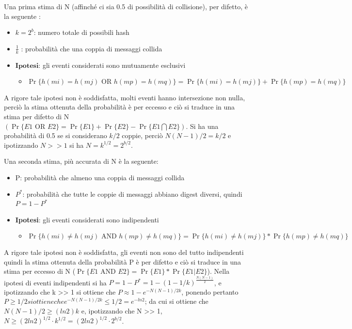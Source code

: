 Una prima stima di N (affinché ci sia 0.5 di possibilità di collisione), per difetto, è la seguente :
\begin{itemize}
\item $k = 2^{b}$: numero totale di possibili hash
\item $\frac{1}{k}$ : probabilità che una coppia di messaggi collida
\item $\textbf{Ipotesi}$: gli eventi considerati sono mutuamente esclusivi 
	\begin{itemize}
		\item $\Pr\{h(mi) = h(mj) \mbox{ OR } h(mp) = h(mq)\} = \Pr\{h(mi) = h(mj)\} + \Pr\{ h(mp) = h(mq)\}$
	\end{itemize}
\end{itemize}
 
A rigore tale ipotesi non è soddisfatta, molti eventi hanno intersezione non nulla, perciò la stima ottenuta della probabilità è per eccesso e ciò si traduce in una stima per difetto di N $(\Pr\{E1 \mbox{ OR } E2\} = \Pr\{E1\} + \Pr\{E2\} - \Pr\{E1 \bigcap E2\})$.
Si ha una probabilità di 0.5 se si considerano $k/2$ coppie, perciò $N(N - 1)/2 = k/2$ e ipotizzando $N >> 1$ si ha $N = k^{1/2} = 2^{b/2}$.

Una seconda stima, più accurata di N è la seguente:
\begin{itemize}
\item P: probabilità che almeno una coppia di messaggi collida
\item $P^{*}$: probabilità che tutte le coppie di messaggi abbiano digest diversi, quindi $P = 1 - P^{*}$
\item \textbf{Ipotesi}: gli eventi considerati sono indipendenti
	\begin{itemize}
		\item $\Pr\{h(mi) \neq h(mj) \mbox{ AND } h(mp) \neq h(mq)\} = \Pr\{h(mi) \neq h(mj)\} * \Pr\{ h(mp) \neq h(mq)\}$
	\end{itemize}
\end{itemize}

A rigore tale ipotesi non è soddisfatta, gli eventi non sono del tutto indipendenti quindi la stima ottenuta della probabilità P è per difetto e ciò si traduce in una stima per eccesso di N ($\Pr\{E1 \mbox{ AND } E2\} = \Pr\{E1\} * \Pr\{E1|E2\}$).
Nella ipotesi di eventi indipendenti si ha $P = 1 - P^{*} = 1 - (1 - 1/k)^{\frac{N(N - 1)}{2}}$, e ipotizzando che k >> 1 si ottiene che $P \approx 1 - e^{- N(N - 1)/2k}$, ponendo pertanto $P\geq1/2 si ottiene che e^{- N(N - 1)/2k} \leqslant 1/2 = e^{-ln2}$; da cui si ottiene che $N(N - 1)/2 \geq (ln2)k$ e, ipotizzando che N >> 1, $N \geqslant (2ln2)^{1/2} \cdot k^{1/2} = (2ln2)^{1/2} \cdot 2^{b/2}$.

